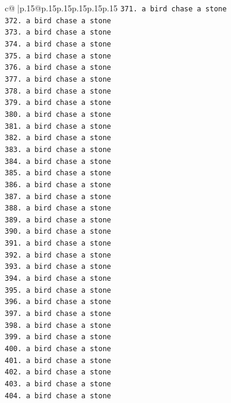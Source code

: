 \documentclass{article}
\begin{document}
{\begin{supertabular}{c@{$\;$}|p{.15\linewidth}@{}p{.15\linewidth}p{.15\linewidth}p{.15\linewidth}p{.15\linewidth}p{.15\linewidth}}
{{{\texttt{371. a bird chase a stone} \\
\texttt{372. a bird chase a stone} \\
\texttt{373. a bird chase a stone} \\
\texttt{374. a bird chase a stone} \\
\texttt{375. a bird chase a stone} \\
\texttt{376. a bird chase a stone} \\
\texttt{377. a bird chase a stone} \\
\texttt{378. a bird chase a stone} \\
\texttt{379. a bird chase a stone} \\
\texttt{380. a bird chase a stone} \\
\texttt{381. a bird chase a stone} \\
\texttt{382. a bird chase a stone} \\
\texttt{383. a bird chase a stone} \\
\texttt{384. a bird chase a stone} \\
\texttt{385. a bird chase a stone} \\
\texttt{386. a bird chase a stone} \\
\texttt{387. a bird chase a stone} \\
\texttt{388. a bird chase a stone} \\
\texttt{389. a bird chase a stone} \\
\texttt{390. a bird chase a stone} \\
\texttt{391. a bird chase a stone} \\
\texttt{392. a bird chase a stone} \\
\texttt{393. a bird chase a stone} \\
\texttt{394. a bird chase a stone} \\
\texttt{395. a bird chase a stone} \\
\texttt{396. a bird chase a stone} \\
\texttt{397. a bird chase a stone} \\
\texttt{398. a bird chase a stone} \\
\texttt{399. a bird chase a stone} \\
\texttt{400. a bird chase a stone} \\
\texttt{401. a bird chase a stone} \\
\texttt{402. a bird chase a stone} \\
\texttt{403. a bird chase a stone} \\
\texttt{404. a bird chase a stone} \\
}}}
\end{supertabular}}
\end{document}
